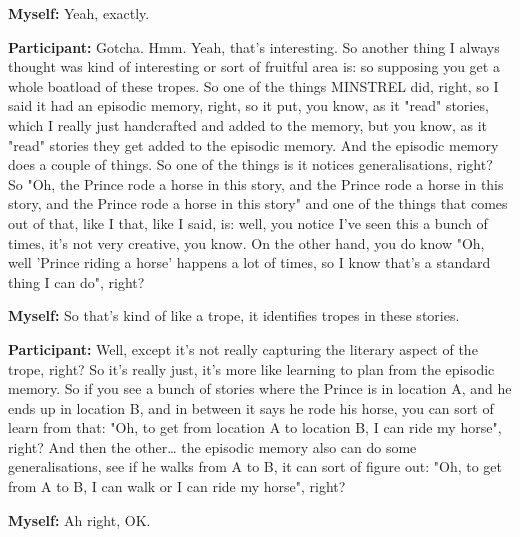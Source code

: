 \documentclass[11pt]{report}
\begin{document}
\begin{linenumbers}
\textbf{Myself:} Yeah, exactly.

\textbf{Participant:} Gotcha. Hmm. Yeah, that's interesting. So another thing I always thought was kind of interesting or sort of fruitful area is: so supposing you get a whole boatload of these tropes. So one of the things MINSTREL did, right, so I said it had an episodic memory, right, so it put, you know, as it "read" stories, which I really just handcrafted and added to the memory, but you know, as it "read" stories they get added to the episodic memory. And the episodic memory does a couple of things. So one of the things is it notices generalisations, right? So "Oh, the Prince rode a horse in this story, and the Prince rode a horse in this story, and the Prince rode a horse in this story" and one of the things that comes out of that, like I that, like I said, is: well, you notice I've seen this a bunch of times, it's not very creative, you know. On the other hand, you do know "Oh, well 'Prince riding a horse' happens a lot of times, so I know that's a standard thing I can do", right?

\textbf{Myself:} So that's kind of like a trope, it identifies tropes in these stories.

\textbf{Participant:} Well, except it's not really capturing the literary aspect of the trope, right? So it's really just, it's more like learning to plan from the episodic memory. So if you see a bunch of stories where the Prince is in location A, and he ends up in location B, and in between it says he rode his horse, you can sort of learn from that: "Oh, to get from location A to location B, I can ride my horse", right? And then the other\ldots{} the episodic memory also can do some generalisations, see if he walks from A to B, it can sort of figure out: "Oh, to get from A to B, I can walk or I can ride my horse", right?

\textbf{Myself:} Ah right, OK.


\end{linenumbers}
\end{document}
